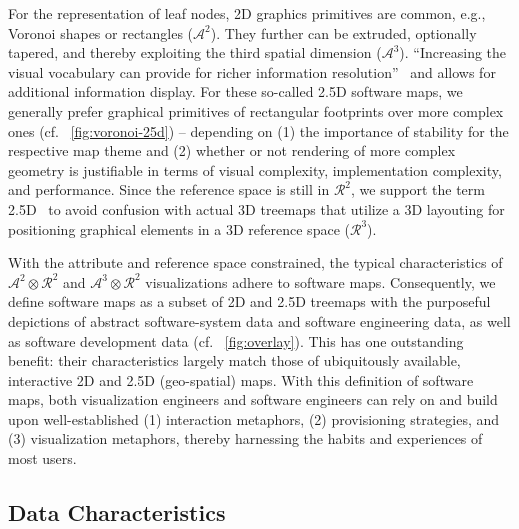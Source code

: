 \documentclass[sigconf]{acmart}
\def\eg{e.g., }
\def\cf{cf. }
\begin{document}
\par
For the representation of leaf nodes, 2D graphics primitives are common, \eg Voronoi shapes or rectangles ($\mathcal{A}^2$).
They further can be extruded, optionally tapered, and thereby exploiting the third spatial dimension ($\mathcal{A}^3$).
\enquote{Increasing the visual vocabulary can provide for richer information resolution}~\cite{turo1992-improve} and allows for additional information display.
For these so-called 2.5D software maps, we generally prefer graphical primitives of rectangular footprints over more complex ones (\cf~\autoref{fig:voronoi-25d}) -- depending on (1) the importance of stability for the respective map theme and (2) whether or not rendering of more complex geometry is justifiable in terms of visual complexity, implementation complexity, and performance.
Since the reference space is still in $\mathcal{R}^2$, we support the term 2.5D~\cite{turo1992-improve} to avoid confusion with actual 3D treemaps that utilize a 3D layouting for positioning graphical elements in a 3D reference space ($\mathcal{R}^3$).
\par
With the attribute and reference space constrained, the typical characteristics of $\mathcal{A}^2\otimes\mathcal{R}^2$ and $\mathcal{A}^3\otimes\mathcal{R}^2$ visualizations adhere to software maps.
Consequently, we define software maps as a subset of 2D and 2.5D treemaps with the purposeful depictions of abstract software-system data and software engineering data, as well as software development data (\cf~\autoref{fig:overlay}).
This has one outstanding benefit: their characteristics largely match those of ubiquitously available, interactive 2D and 2.5D (geo-spatial) maps.
With this definition of software maps, both visualization engineers and software engineers can rely on and build upon well-established (1) interaction metaphors, (2) provisioning strategies, and (3) visualization metaphors, thereby harnessing the habits and experiences of most users.

\subsection{Data Characteristics}
\end{document}
